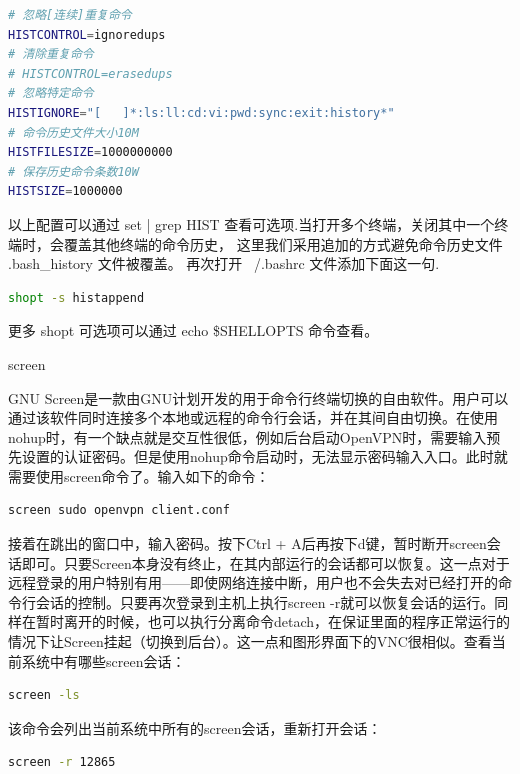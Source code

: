 \documentclass[12pt]{book}
\makeatletter
\numberwithin{dummy}{section}
\theoremstyle{ocrenumbox}
\theoremstyle{blacknumex}
\theoremstyle{blacknumbox}
\theoremstyle{ocrenum}
\renewcommand{\subsubsection}{\@startsection {subsubsection}{3}{\z@}
	{-2ex \@plus -0.1ex \@minus -.2ex}
	{.2ex \@plus.2ex }
	{\normalfont\small\sffamily\bfseries}}
\makeatother
\begin{document}
\begin{lstlisting}[language=Bash]
# 忽略[连续]重复命令
HISTCONTROL=ignoredups
# 清除重复命令
# HISTCONTROL=erasedups
# 忽略特定命令
HISTIGNORE="[   ]*:ls:ll:cd:vi:pwd:sync:exit:history*"
# 命令历史文件大小10M
HISTFILESIZE=1000000000
# 保存历史命令条数10W
HISTSIZE=1000000
\end{lstlisting}

以上配置可以通过 set | grep HIST 查看可选项.当打开多个终端，关闭其中一个终端时，会覆盖其他终端的命令历史， 这里我们采用追加的方式避免命令历史文件 .bash\_history 文件被覆盖。 再次打开 ~/.bashrc 文件添加下面这一句.

\begin{lstlisting}[language=Bash]
shopt -s histappend
\end{lstlisting}

更多 shopt 可选项可以通过 echo \$SHELLOPTS 命令查看。


\subsubsection{screen}

GNU Screen是一款由GNU计划开发的用于命令行终端切换的自由软件。用户可以通过该软件同时连接多个本地或远程的命令行会话，并在其间自由切换。在使用nohup时，有一个缺点就是交互性很低，例如后台启动OpenVPN时，需要输入预先设置的认证密码。但是使用nohup命令启动时，无法显示密码输入入口。此时就需要使用screen命令了。输入如下的命令：

\begin{lstlisting}[language=Bash]
screen sudo openvpn client.conf
\end{lstlisting}

接着在跳出的窗口中，输入密码。按下Ctrl + A后再按下d键，暂时断开screen会话即可。只要Screen本身没有终止，在其内部运行的会话都可以恢复。这一点对于远程登录的用户特别有用——即使网络连接中断，用户也不会失去对已经打开的命令行会话的控制。只要再次登录到主机上执行screen -r就可以恢复会话的运行。同样在暂时离开的时候，也可以执行分离命令detach，在保证里面的程序正常运行的情况下让Screen挂起（切换到后台）。这一点和图形界面下的VNC很相似。查看当前系统中有哪些screen会话：

\begin{lstlisting}[language=Bash]
screen -ls
\end{lstlisting}

该命令会列出当前系统中所有的screen会话，重新打开会话：

\begin{lstlisting}[language=Bash]
screen -r 12865
\end{lstlisting}
\end{document}
